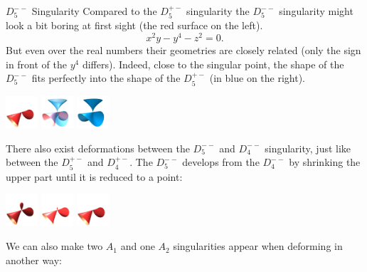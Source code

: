 \begin{surferPage}[D5-- Singularity]{$D_5^{--}$ Singularity}
	Compared to the $D_5^{+-}$ singularity the $D_5^{--}$ singularity might look a bit boring at first sight (the red surface on the left).
	\[
		x^2y-y^4-z^2=0.
	\]
	But even over the real numbers their geometries are closely related (only the sign in front of the $y^4$ differs). Indeed, close to the singular point, the shape of the $D_5^{--}$ fits perfectly into the shape of the $D_5^{+-}$ (in blue on the right).
	\begin{Centering*}%
		\includegraphics[width=1.2cm]{../../common/images/D5mm_01}\quad%
		\includegraphics[width=1.2cm]{../../common/images/D5pm_D5mm}\quad%
		\includegraphics[width=1.2cm]{../../common/images/D5pm_blue}%
	\end{Centering*}
	There also exist deformations between the $D_5^{--}$ and $D_4^{--}$ singularity, just like between the $D_5^{+-}$ and $D_4^{+-}$. The $D_5^{--}$ develops from the $D_4^{--}$ by shrinking the upper part until it is reduced to a point:
    \vspace{-1ex}
	\begin{Centering*}%
		\includegraphics[width=1.2cm]{../../common/images/D5mm_03}\quad%
		\includegraphics[width=1.2cm]{../../common/images/D5mm_02}\quad%
		\includegraphics[width=1.2cm]{../../common/images/D5mm_01}%
	\end{Centering*}
	We can also make two $A_1$ and one $A_2$ singularities appear when deforming in another way:

\end{surferPage}
